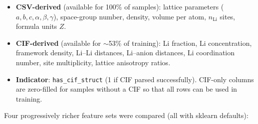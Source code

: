 \documentclass[11pt,a4paper]{article}
\begin{document}
\begin{itemize}[leftmargin=*]
      \item \textbf{CSV-derived} (available for 100\% of samples): lattice
            parameters ($a, b, c, \alpha, \beta, \gamma$), space-group number,
            density, volume per atom, $n_{\text{Li}}$ sites, formula units $Z$.
      \item \textbf{CIF-derived} (available for $\sim$53\% of training): Li
            fraction, Li concentration, framework density, Li--Li distances,
            Li--anion distances, Li coordination number, site multiplicity,
            lattice anisotropy ratios.
      \item \textbf{Indicator}: \texttt{has\_cif\_struct} (1 if CIF parsed
            successfully).  CIF-only columns are zero-filled for samples without
            a CIF so that all rows can be used in training.
\end{itemize}

Four progressively richer feature sets were compared (all with sklearn
defaults):
\end{document}
